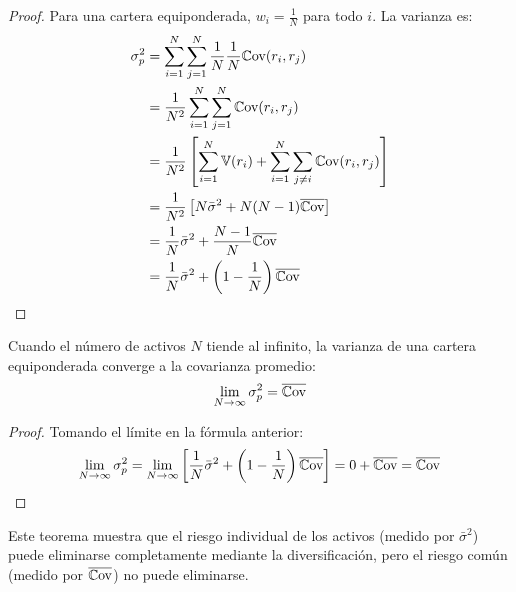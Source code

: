 \begin{proof}
Para una cartera equiponderada, $w_i = \frac{1}{N}$ para todo $i$. La varianza es:
\begin{align*}
\sigma_p^2 &= \sum_{i=1}^{N} \sum_{j=1}^{N} \frac{1}{N} \frac{1}{N} \mathbb{C}\text{ov}(r_i, r_j) \\
&= \frac{1}{N^2} \sum_{i=1}^{N} \sum_{j=1}^{N} \mathbb{C}\text{ov}(r_i, r_j) \\
&= \frac{1}{N^2} \left[\sum_{i=1}^{N} \mathbb{V}(r_i) + \sum_{i=1}^{N} \sum_{j \neq i} \mathbb{C}\text{ov}(r_i, r_j)\right] \\
&= \frac{1}{N^2} \left[N \bar{\sigma}^2 + N(N-1) \overline{\mathbb{C}\text{ov}}\right] \\
&= \frac{1}{N} \bar{\sigma}^2 + \frac{N-1}{N} \overline{\mathbb{C}\text{ov}} \\
&= \frac{1}{N} \bar{\sigma}^2 + \left(1 - \frac{1}{N}\right) \overline{\mathbb{C}\text{ov}}
\end{align*}
\end{proof}

\begin{teorema}
Cuando el número de activos $N$ tiende al infinito, la varianza de una cartera equiponderada converge a la covarianza promedio:
\begin{equation}
\lim_{N \to \infty} \sigma_p^2 = \overline{\mathbb{C}\text{ov}}
\end{equation}
\end{teorema}

\begin{proof}
Tomando el límite en la fórmula anterior:
$$\lim_{N \to \infty} \sigma_p^2 = \lim_{N \to \infty} \left[\frac{1}{N} \bar{\sigma}^2 + \left(1 - \frac{1}{N}\right) \overline{\mathbb{C}\text{ov}}\right] = 0 + \overline{\mathbb{C}\text{ov}} = \overline{\mathbb{C}\text{ov}}$$
\end{proof}

Este teorema muestra que el riesgo individual de los activos (medido por $\bar{\sigma}^2$) puede eliminarse completamente mediante la diversificación, pero el riesgo común (medido por $\overline{\mathbb{C}\text{ov}}$) no puede eliminarse.


